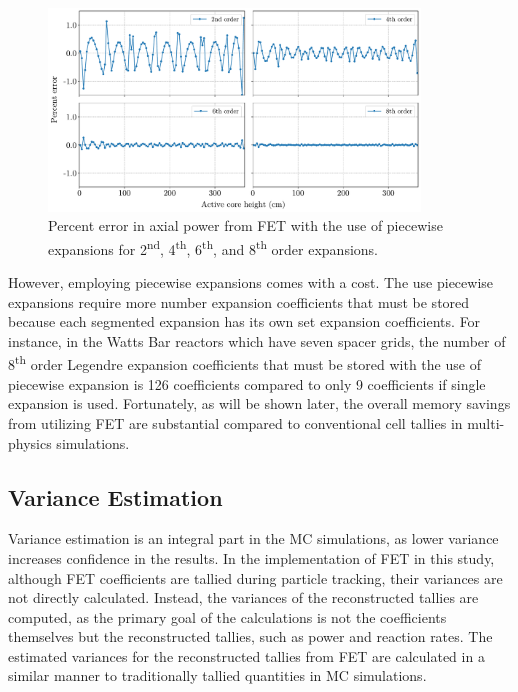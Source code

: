 \begin{figure}
    \centering
    \includegraphics[width=0.88\textwidth]{figs/piecewise.pdf}
    \caption[Percent error in axial power from FET with the use of piecewise expansions.]{Percent error in axial power from FET with the use of piecewise expansions for 2\textsuperscript{nd}, 4\textsuperscript{th}, 6\textsuperscript{th}, and 8\textsuperscript{th} order expansions.}
    \label{fig_21z}
\end{figure}

However, employing piecewise expansions comes with a cost. The use piecewise expansions require more number expansion coefficients that must be stored because each segmented expansion has its own set expansion coefficients. For instance, in the Watts Bar reactors which have seven spacer grids, the number of 8\textsuperscript{th} order Legendre expansion coefficients that must be stored with the use of piecewise expansion is 126 coefficients compared to only 9 coefficients if single expansion is used. Fortunately, as will be shown later, the overall memory savings from utilizing FET are substantial compared to conventional cell tallies in multi-physics simulations.

\subsection{Variance Estimation}\label{sec22a}

Variance estimation is an integral part in the MC simulations, as lower variance increases confidence in the results. In the implementation of FET in this study, although FET coefficients are tallied during particle tracking, their variances are not directly calculated. Instead, the variances of the reconstructed tallies are computed, as the primary goal of the calculations is not the coefficients themselves but the reconstructed tallies, such as power and reaction rates. The estimated variances for the reconstructed tallies from FET are calculated in a similar manner to traditionally tallied quantities in MC simulations.

